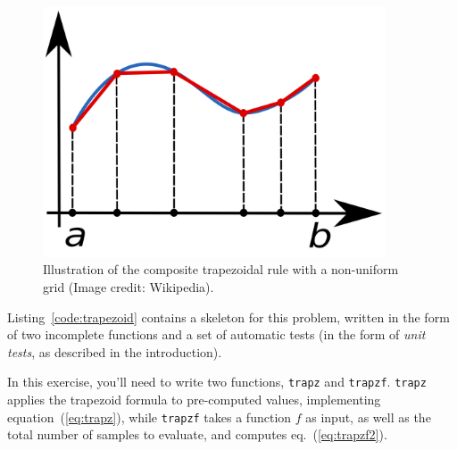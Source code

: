%
\begin{figure}
\begin{centering}\includegraphics[width=4in]{fig/Composite_trapezoidal_rule_illustration}\par\end{centering}


\caption{\label{fig:trapezoid}Illustration of the composite trapezoidal rule
with a non-uniform grid (Image credit: Wikipedia).}
\end{figure}


Listing~\ref{code:trapezoid} contains a skeleton for this problem,
written in the form of two incomplete functions and a set of automatic
tests (in the form of \emph{unit tests}, as described in the introduction).



In this exercise, you'll need to write two functions, \texttt{trapz}
and \texttt{trapzf}. \texttt{trapz} applies the trapezoid formula
to pre-computed values, implementing equation~(\ref{eq:trapz}),
while \texttt{trapzf} takes a function $f$ as input, as well as the
total number of samples to evaluate, and computes eq.~(\ref{eq:trapzf2}).
